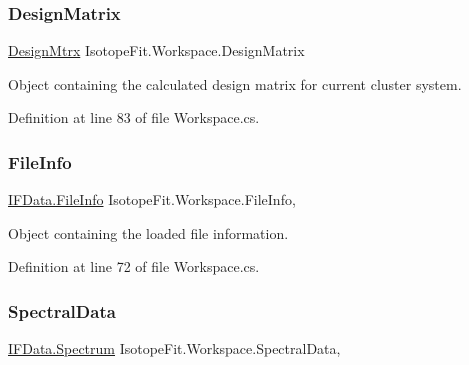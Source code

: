 \subsubsection{\texorpdfstring{Design\+Matrix}{DesignMatrix}}
{\footnotesize\ttfamily \mbox{\hyperlink{class_isotope_fit_1_1_workspace_1_1_design_mtrx}{Design\+Mtrx}} Isotope\+Fit.\+Workspace.\+Design\+Matrix\hspace{0.3cm}{\ttfamily [get]}}



Object containing the calculated design matrix for current cluster system. 



Definition at line 83 of file Workspace.\+cs.

\mbox{\label{class_isotope_fit_1_1_workspace_a54c0025eccacbf519f619ef256414a92}} 
\subsubsection{\texorpdfstring{File\+Info}{FileInfo}}
{\footnotesize\ttfamily \mbox{\hyperlink{class_isotope_fit_1_1_i_f_data_1_1_file_info}{I\+F\+Data.\+File\+Info}} Isotope\+Fit.\+Workspace.\+File\+Info\hspace{0.3cm}{\ttfamily [get]}, {\ttfamily [set]}}



Object containing the loaded file information. 



Definition at line 72 of file Workspace.\+cs.

\mbox{\label{class_isotope_fit_1_1_workspace_a1d6cc2dd07cbfe920da9f1bffc9b32c2}} 
\subsubsection{\texorpdfstring{Spectral\+Data}{SpectralData}}
{\footnotesize\ttfamily \mbox{\hyperlink{class_isotope_fit_1_1_i_f_data_1_1_spectrum}{I\+F\+Data.\+Spectrum}} Isotope\+Fit.\+Workspace.\+Spectral\+Data\hspace{0.3cm}{\ttfamily [get]}, {\ttfamily [set]}}



